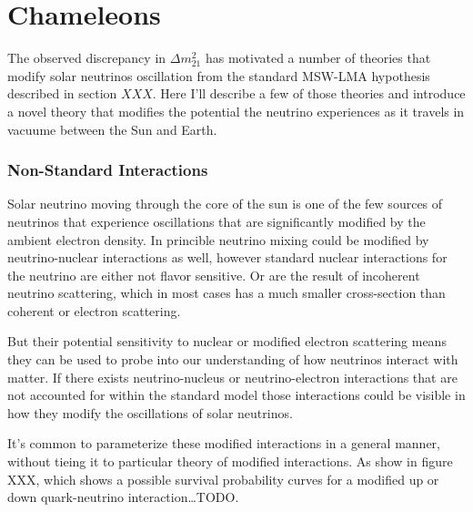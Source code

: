 
\chapter{Chameleons}

\ifpdf
    \graphicspath{{chameleons}{chameleons/figures/PDF/}{chameleons/figures/}}
\else
    \graphicspath{{chameleons/figures/EPS/}{chameleons/figures/}}
\fi


The observed discrepancy in $\Delta m^{2}_{21}$ has motivated a number
of theories that modify solar neutrinos oscillation from the standard
MSW-LMA hypothesis described in section $XXX$.
Here I'll describe a few of those theories and introduce a novel theory
that modifies the potential the neutrino experiences as it travels in
vacuume between the Sun and Earth.

\subsection{Non-Standard Interactions}
Solar neutrino moving through the core of the sun is one of the few sources
of neutrinos that experience oscillations that are significantly modified by
the ambient electron density.
In princible neutrino mixing could be modified by neutrino-nuclear interactions
as well, however standard nuclear interactions for the neutrino are either
not flavor sensitive. Or are the result of incoherent neutrino scattering, which
in most cases has a much smaller  cross-section than coherent or electron scattering.


But their potential sensitivity to nuclear or modified electron scattering
means they can be used to probe into our understanding of how neutrinos
interact with matter.
If there exists neutrino-nucleus or neutrino-electron interactions that are
not accounted for within the standard model those interactions could be visible
in how they modify the oscillations of solar neutrinos.


It's common to parameterize these modified interactions in a general manner,
without tieing it to particular theory of modified interactions. As show in
figure XXX, which shows a possible survival probability curves for a modified
up or down quark-neutrino interaction\ldots TODO.\@

